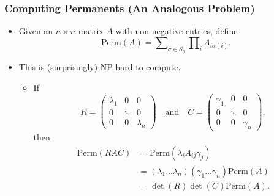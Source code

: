 \documentclass[usenames,dvipsnames,12pt]{beamer}
\begin{document}


\begin{frame}
    \frametitle{Computing Permanents (An Analogous Problem)}

    \begin{itemize}
        \pause
        \item Given an $n \times n$ matrix $A$ with non-negative entries, define
        \[ \text{Perm}(A) = \sum\nolimits_{\sigma \in S_n} \prod\nolimits_i A_{i \sigma(i)}. \]
        
        \pause
        \item This is (surprisingly) NP hard to compute.

        \begin{itemize}
            \pause
            \item If
            \footnotesize
            \[ R = \begin{pmatrix} \lambda_1 & 0 & 0 \\ 0 & \ddots & 0 \\ 0 & 0 & \lambda_n \end{pmatrix} \quad\text{and}\quad C = \begin{pmatrix} \gamma_1 & 0 & 0 \\ 0 & \ddots & 0 \\ 0 & 0 & \gamma_n \end{pmatrix}, \]
            \normalsize
            then
            \begin{align*}
                \text{Perm}(RAC) &= \text{Perm}(\lambda_i A_{ij} \gamma_j)\\
                &= (\lambda_1 \dots \lambda_n) (\gamma_1 \dots \gamma_n) \text{Perm}(A)\\
                &= \det(R) \det(C) \text{Perm}(A).
            \end{align*}
        \end{itemize}
    \end{itemize}
\end{frame}
\end{document}
